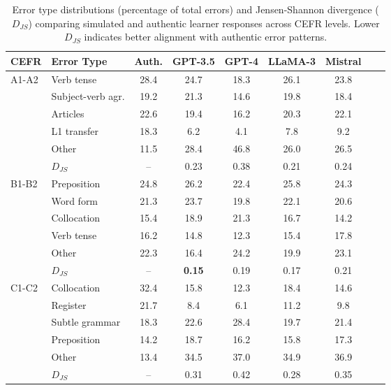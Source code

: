 \begin{table*}[ht]
\centering
\caption{Error type distributions (percentage of total errors) and Jensen-Shannon divergence ($D_{JS}$) comparing simulated and authentic learner responses across CEFR levels. Lower $D_{JS}$ indicates better alignment with authentic error patterns.}
\label{tab:error_types_production}
\small
\begin{tabular}{llccccccc}
\toprule
\textbf{CEFR} & \textbf{Error Type} & \textbf{Auth.} & \textbf{GPT-3.5} & \textbf{GPT-4} & \textbf{LLaMA-3} & \textbf{Mistral} \\
\midrule
\multirow{5}{*}{A1-A2}
& Verb tense & 28.4 & 24.7 & 18.3 & 26.1 & 23.8 \\
& Subject-verb agr. & 19.2 & 21.3 & 14.6 & 19.8 & 18.4 \\
& Articles & 22.6 & 19.4 & 16.2 & 20.3 & 22.1 \\
& L1 transfer & 18.3 & 6.2 & 4.1 & 7.8 & 9.2 \\
& Other & 11.5 & 28.4 & 46.8 & 26.0 & 26.5 \\
& \textit{$D_{JS}$} & -- & 0.23 & 0.38 & 0.21 & 0.24 \\
\midrule
\multirow{5}{*}{B1-B2}
& Preposition & 24.8 & 26.2 & 22.4 & 25.8 & 24.3 \\
& Word form & 21.3 & 23.7 & 19.8 & 22.1 & 20.6 \\
& Collocation & 15.4 & 18.9 & 21.3 & 16.7 & 14.2 \\
& Verb tense & 16.2 & 14.8 & 12.3 & 15.4 & 17.8 \\
& Other & 22.3 & 16.4 & 24.2 & 19.9 & 23.1 \\
& \textit{$D_{JS}$} & -- & \textbf{0.15} & 0.19 & 0.17 & 0.21 \\
\midrule
\multirow{5}{*}{C1-C2}
& Collocation & 32.4 & 15.8 & 12.3 & 18.4 & 14.6 \\
& Register & 21.7 & 8.4 & 6.1 & 11.2 & 9.8 \\
& Subtle grammar & 18.3 & 22.6 & 28.4 & 19.7 & 21.4 \\
& Preposition & 14.2 & 18.7 & 16.2 & 15.8 & 17.3 \\
& Other & 13.4 & 34.5 & 37.0 & 34.9 & 36.9 \\
& \textit{$D_{JS}$} & -- & 0.31 & 0.42 & 0.28 & 0.35 \\
\bottomrule
\end{tabular}
\end{table*}
